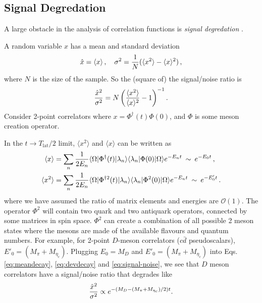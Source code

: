 \subsection{Signal Degredation}
\label{sec:signaldegredation}

A large obstacle in the analysis of correlation functions is \textit{signal degredation} \cite{Parisi:1983ae,Lepage:1989hd}.

A random variable $x$ has a mean and standard deviation
\begin{align}
  \hat{x} = \langle x \rangle\,,\quad
  \sigma^2 = {1\over N} ( \langle x^2 \rangle - \langle x \rangle^2 )\,,
\end{align}
where $N$ is the size of the sample. So the (square of) the signal/noise ratio is
\begin{align}
  {\hat{x}^2\over \sigma^2} = N \left( {\langle x^2 \rangle \over \langle x \rangle^2} - 1 \right) ^{-1}.
  \label{eq:signal-noise}
\end{align}
Consider 2-point correlators where $x = \Phi^{\dagger}(t) \Phi(0)$, and $\Phi$ is some meson creation operator.

In the $t\to T_{\text{lat}}/2$ limit, $\langle x^2 \rangle$ and $\langle x \rangle$ can be written as
\begin{align}
  \label{eq:meandecay}
  \langle x \rangle &= \sum_n {1\over 2E_n} \langle \Omega | \Phi^{\dagger}(t) | \lambda_n \rangle \langle \lambda_n | \Phi(0) | \Omega \rangle e^{-E_n t} \,\,\,{\sim}\,\,\, e^{-E_0 t}\,, \\
  \langle x^2 \rangle &= \sum_n {1\over 2E_n} \langle \Omega | \Phi^{\dagger 2}(t) | \lambda_n \rangle \langle \lambda_n | \Phi^2(0) | \Omega \rangle e^{-E_n t} \,\,\,{\sim}\,\,\, e^{-E'_0 t}\,.
  \label{eq:devdecay}
\end{align}
where we have assumed the ratio of matrix elements and energies are $\mathcal{O}(1)$. The operator $\Phi^2$ will contain two quark and two antiquark operators, connected by some matrices in spin space. $\Phi^2$ can create a combination of all possible 2 meson states where the mesons are made of the available flavours and quantum numbers. For example, for 2-point $D$-meson correlators ($c\bar{d}$ pseudoscalars), $E'_0 = (M_{\pi}+M_{\eta_c})$. Plugging $E_0=M_{D}$ and $E'_0=(M_{\pi}+M_{\eta_c})$ into Eqs. \eqref{eq:meandecay}, \eqref{eq:devdecay} and \eqref{eq:signal-noise}, we see that $D$ meson correlators have a signal/noise ratio that degrades like
\begin{align}
  {\hat{x}^2\over \sigma^2} \propto e^{-(M_{D}-(M_{\pi}+M_{\eta_c})/2)t}.
\end{align}

